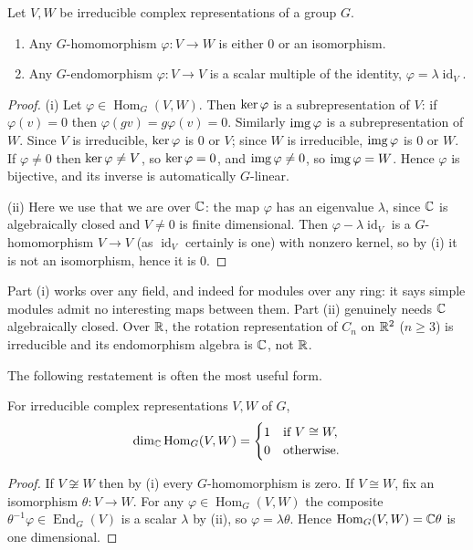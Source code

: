 \documentclass[a4paper]{scrartcl}
\newcommand{\Hom}{\operatorname{Hom}}
\newcommand{\End}{\operatorname{End}}
\newcommand{\id}{\operatorname{id}}
\begin{document}
\begin{theorem}
	Let $V, W$ be irreducible complex representations of a group $G$.
	\begin{enumerate}[label=(\roman*)]
		\item Any $G$-homomorphism $\varphi: V \to W$ is either $0$ or an isomorphism.
		\item Any $G$-endomorphism $\varphi : V \to V$ is a scalar multiple of the identity, $\varphi = \lambda \id_V$.
	\end{enumerate}
\end{theorem}
\begin{proof}
	(i) Let $\varphi \in \Hom_G(V,W)$. Then $\operatorname{ker}\varphi$ is a subrepresentation of $V$: if $\varphi(v) = 0$ then $\varphi(gv) = g\varphi(v) = 0$. Similarly $\operatorname{img} \varphi$ is a subrepresentation of $W$. Since $V$ is irreducible, $\operatorname{ker} \varphi$ is $0$ or $V$; since $W$ is irreducible, $\operatorname{img} \varphi$ is $0$ or $W$. If $\varphi \neq 0$ then $\operatorname{ker} \varphi \neq V$, so $\operatorname{ker} \varphi = 0$, and $\operatorname{img} \varphi \neq 0$, so $\operatorname{img} \varphi = W$. Hence $\varphi$ is bijective, and its inverse is automatically $G$-linear.

	(ii) Here we use that we are over $\mathbb{C}$: the map $\varphi$ has an eigenvalue $\lambda$, since $\mathbb{C}$ is algebraically closed and $V \neq 0$ is finite dimensional. Then $\varphi - \lambda\id_V$ is a $G$-homomorphism $V \to V$ (as $\id_V$ certainly is one) with nonzero kernel, so by (i) it is not an isomorphism, hence it is $0$.
\end{proof}

\begin{remark}
	Part (i) works over any field, and indeed for modules over any ring: it says simple modules admit no interesting maps between them. Part (ii) genuinely needs $\mathbb{C}$ algebraically closed. Over $\mathbb{R}$, the rotation representation of $C_n$ on $\mathbb{R}^2$ ($n \geq 3$) is irreducible and its endomorphism algebra is $\mathbb{C}$, not $\mathbb{R}$.
\end{remark}

The following restatement is often the most useful form.

\begin{corollary}
	For irreducible complex representations $V, W$ of $G$,
	$$\dim_\C \Hom_G(V,W) = \begin{cases} 1 & \text{if } V \cong W, \\ 0 & \text{otherwise.}\end{cases}$$
\end{corollary}
\begin{proof}
	If $V \not\cong W$ then by (i) every $G$-homomorphism is zero. If $V \cong W$, fix an isomorphism $\theta : V \to W$. For any $\varphi \in \Hom_G(V,W)$ the composite $\theta^{-1}\varphi \in \End_G(V)$ is a scalar $\lambda$ by (ii), so $\varphi = \lambda \theta$. Hence $\Hom_G(V,W) = \C\theta$ is one dimensional.
\end{proof}
\end{document}
